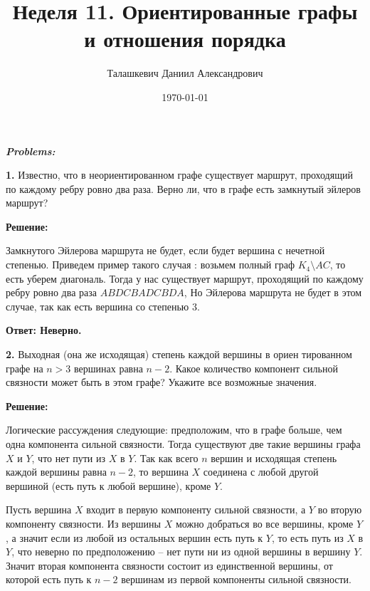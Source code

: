 \documentclass[a4paper,12pt]{article} %
\author{Талашкевич Даниил Александрович}
\title{Неделя 11. Ориентированные графы
и отношения порядка}
\date{\today}
\begin{document}
\maketitle
\thispagestyle{empty}

\newpage
\setcounter{page}{1}
\begin{center}
\itshape
\bfseries
{ \Large Problems:}
\end{center}

{\bf 1.} Известно, что в неориентированном графе существует маршрут,
проходящий по каждому ребру ровно два раза. Верно ли, что в графе
есть замкнутый эйлеров маршрут?
\begin{center}
\bfseries
{\Large Решение: }
\end{center}

Замкнутого Эйлерова маршрута не будет, если будет вершина с нечетной степенью. Приведем пример такого случая :	возьмем полный граф $K_4 \setminus {AC}$, то есть уберем диагональ. Тогда у нас существует маршрут, проходящий по каждому ребру ровно два раза $ABDCBADCBDA$, Но Эйлерова маршрута не будет в этом случае, так как есть вершина со степенью $3$.

\begin{flushright}
\begin{large}
\textbf {Ответ: Неверно.}
\end{large}
\end{flushright}

{\bf 2.} Выходная (она же исходящая) степень каждой вершины в ориен тированном графе на $n > 3$ вершинах равна $n - 2$. Какое количество компонент сильной связности может быть в этом графе? Укажите все возможные значения.
\begin{center}
\bfseries
{\Large Решение: }
\end{center}

Логические рассуждения следующие: предположим, что в графе больше, чем одна компонента сильной связности. Тогда существуют две такие вершины графа $X$ и $Y$, что нет пути из $X$ в $Y$. Так как всего $n$ вершин и исходящая степень каждой вершины равна $n-2$, то вершина $X$ соединена с любой другой вершиной (есть путь к любой вершине), кроме $Y$. 

Пусть вершина $X$ входит в первую компоненту сильной связности, а $Y$ во вторую компоненту связности. Из вершины $X$ можно добраться во все вершины, кроме $Y$, а значит если из любой из остальных вершин есть путь к $Y$, то есть путь из $X$ в $Y$, что неверно по предположению -- нет пути ни из одной вершины в вершину $Y$. Значит вторая компонента связности состоит из единственной вершины, от которой есть путь к $n-2$ вершинам из первой компоненты сильной связности.
\end{document}
